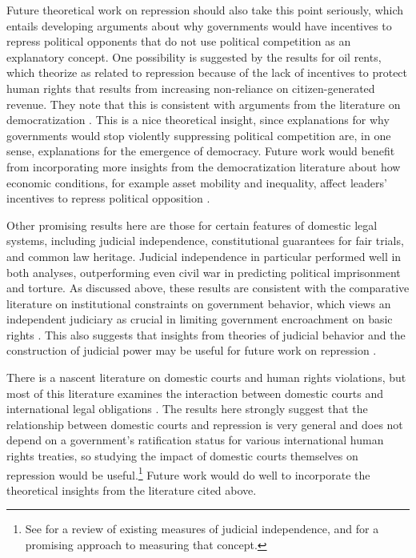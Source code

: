 \documentclass[12pt]{article}
\begin{document}
Future theoretical work on repression should also take this point seriously, which entails developing arguments about why governments would have incentives to repress political opponents that do not use political competition as an explanatory concept. One possibility is suggested by the results for oil rents, which \citet{DemerittYoung2013} theorize as related to repression because of the lack of incentives to protect human rights that results from increasing non-reliance on citizen-generated revenue. They note that this is consistent with arguments from the literature on democratization \citep[E.g.][]{Huntington1991,BDMSmith2009}. This is a nice theoretical insight, since explanations for why governments would stop violently suppressing political competition are, in one sense, explanations for the emergence of democracy. Future work would benefit from incorporating more insights from the democratization literature about how economic conditions, for example asset mobility and inequality, affect leaders' incentives to repress political opposition \citep[See, e.g.][]{Boix2003,AcemogluRobinson2005,ClarkGolderGolder2013}. 

Other promising results here are those for certain features of domestic legal systems, including judicial independence, constitutional guarantees for fair trials, and common law heritage. Judicial independence in particular performed well in both analyses, outperforming even civil war in predicting political imprisonment and torture. As discussed above, these results are consistent with the comparative literature on institutional constraints on government behavior, which views an independent judiciary as crucial in limiting government encroachment on basic rights \citep[See esp.][]{NorthWeingast1989,Weingast1997,Vanberg2005}. This also suggests that insights from theories of judicial behavior and the construction of judicial power may be useful for future work on repression \citep[See][]{Vanberg2005,Staton2006,Carrubba2009,StatonMoore2011}. 

There is a nascent literature on domestic courts and human rights violations, but most of this literature examines the interaction between domestic courts and international legal obligations \citep{Hathaway2007,PowellStaton2009,Simmons2009,Conrad2012,ConradRitter2013,Lupu2013}. The results here strongly suggest that the relationship between domestic courts and repression is very general and does not depend on a government's ratification status for various international human rights treaties, so studying the impact of domestic courts themselves on repression would be useful.\footnote{See \citet{RiosStaton2012} for a review of existing measures of judicial independence, and \citet{LinzerStaton2011} for a promising approach to measuring that concept.} Future work would do well to incorporate the theoretical insights from the literature cited above.
\end{document}
